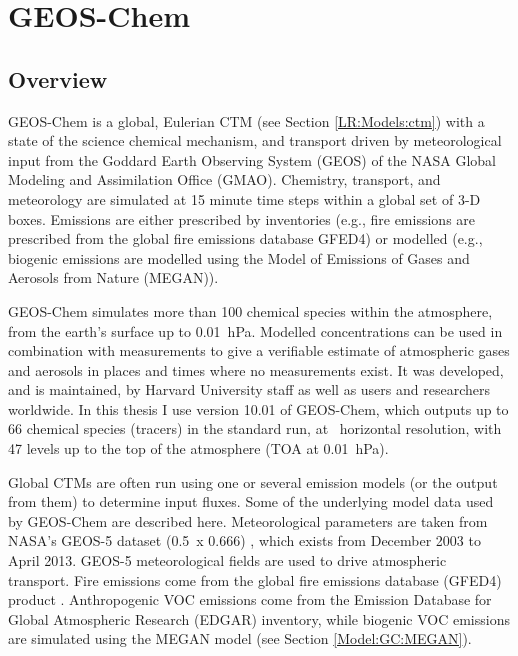 \section{GEOS-Chem}
\label{Model:GC}

  \subsection{Overview}
    GEOS-Chem is a global, Eulerian CTM (see Section \ref{LR:Models:ctm}) with a state of the science chemical mechanism, and transport driven by meteorological input from the Goddard Earth Observing System (GEOS) of the NASA Global Modeling and Assimilation Office (GMAO).
    Chemistry, transport, and meteorology are simulated at 15 minute time steps within a global set of 3-D boxes.
    Emissions are either prescribed by inventories (e.g., fire emissions are prescribed from the global fire emissions database GFED4) or modelled (e.g., biogenic emissions are modelled using the Model of Emissions of Gases and Aerosols from Nature (MEGAN)).
    
    GEOS-Chem simulates more than 100 chemical species within the atmosphere, from the earth's surface up to 0.01~hPa.
    Modelled concentrations can be used in combination with measurements to give a verifiable estimate of atmospheric gases and aerosols in places and times where no measurements exist.
    It was developed, and is maintained, by Harvard University staff as well as users and researchers worldwide.
    In this thesis I use version 10.01 of GEOS-Chem, which outputs up to 66 chemical species (tracers) in the standard run, at \lowhr ~horizontal resolution, with 47 levels up to the top of the atmosphere (TOA at 0.01~hPa).
    
    
    Global CTMs are often run using one or several emission models (or the output from them) to determine input fluxes.
    Some of the underlying model data used by GEOS-Chem are described here.
    Meteorological parameters are taken from NASA's GEOS-5 dataset (0.5\degr ~x 0.666\degr) \parencite{Chen2009}, which exists from December 2003 to April 2013.
    GEOS-5 meteorological fields are used to drive atmospheric transport.
    Fire emissions come from the global fire emissions database (GFED4) product \parencite{Giglio2013}. 
    Anthropogenic VOC emissions come from the Emission Database for Global Atmospheric Research (EDGAR) inventory, while biogenic VOC emissions are simulated using the MEGAN model (see Section \ref{Model:GC:MEGAN}).


